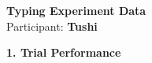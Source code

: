 \documentclass[10pt,a4paper]{article}
\begin{document}

\begin{center}
    {\Large\bfseries Typing Experiment Data}\\
    \vspace{2pt}
    Participant: \textbf{Tushi}
\end{center}

\vspace{0.25cm}


\noindent
{\large\bfseries 1. Trial Performance}

\vspace{0.08cm}
\end{document}
